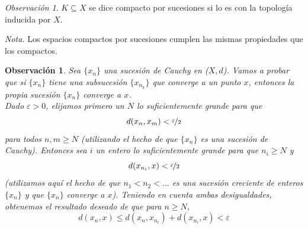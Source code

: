 \documentclass[12pt,twoside]{report}
\theoremstyle{azul}
\theoremstyle{azul2}
\newtheorem*{obsx}{Observación}
\theoremstyle{plain}
\theoremstyle{definition}
\theoremstyle{remark}
\newtheorem*{obs}{Observación}
\begin{document}
\begin{obs}
$K \subseteq X$ se dice compacto por sucesiones si lo es con la topología inducida por $X$.
\end{obs}
\hspace{-7mm} \textit{Nota.} Los espacios compactos por sucesiones cumplen las mismas propiedades que los compactos. 
\begin{obsx}
Sea $\{ x_n \}$ una sucesión de Cauchy en ($X,d$). Vamos a probar que si $\{ x_n \}$ tiene una subsucesión $\{ x_{n_k} \}$ que converge a un punto $x$, entonces la propia sucesión $\{ x_n \}$ converge a $x$. \\
\hspace{0.6cm} Dado $\varepsilon > 0$, elijamos primero un $N$ lo suficientemente grande para que 
$$d(x_n,x_m) < \nicefrac{\varepsilon}{2}$$
para todos $n,m \geq N$ (utilizando el hecho de que $\{ x_n \}$ es una sucesión de Cauchy). Entonces sea $i$ un entero lo suficientemente grande para que $n_i \geq N$ y
$$d(x_{n_i}, x) < \nicefrac{\varepsilon}{2}$$
(utilizamos aquí el hecho de que $n_1 < n_2 < \ldots$ es una sucesión creciente de enteros $\{ x_n \}$ y que $\{ x_n \}$ converge a $x$). Teniendo en cuenta ambas desigualdades, obtenemos el resultado deseado de que para $n \geq N$,
$$d(x_n,x) \leq d(x_n, x_{n_i}) + d(x_{n_i}, x) < \varepsilon$$
\end{obsx}
\end{document}
